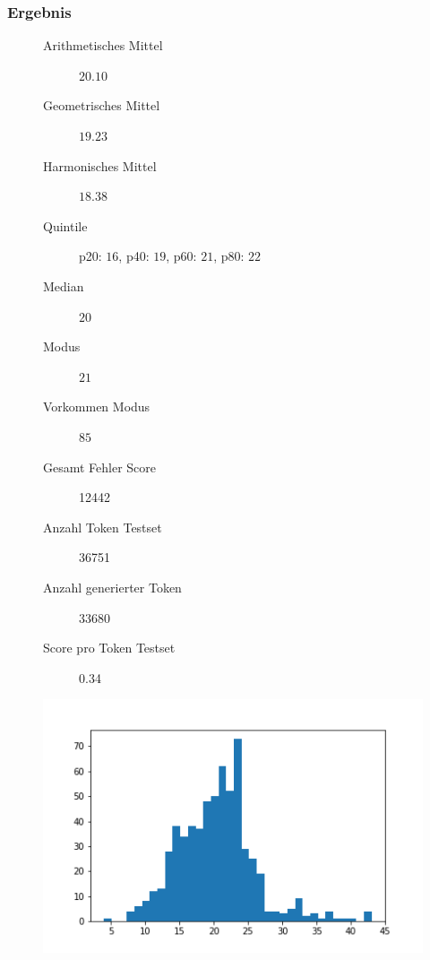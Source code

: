 \documentclass[pdftex,a4paper,halfparskip, article]{scrartcl}
\begin{document}
\subsubsection*{Ergebnis}

\begin{figure}
\centering
\begin{minipage}{.5\textwidth}
  \centering
  \begin{description}
	\item[Arithmetisches Mittel] $20.10$	
	\item[Geometrisches Mittel] $19.23$
	\item[Harmonisches Mittel] $18.38$
	\item[Quintile] p20: $16$, p40: $19$, p60: $21$, p80: $22$
	\item[Median] $20$
	\item[Modus] $21$
	\item[Vorkommen Modus] $85$
	\item[Gesamt Fehler Score] 12442
	\item[Anzahl Token Testset] 36751 
	\item[Anzahl generierter Token] 33680
	\item[Score pro Token Testset]  0.34
\end{description}
  \label{fig:lage_bin19_x}
\end{minipage}%
\begin{minipage}{.5\textwidth}
  \centering
  \includegraphics[width=1\linewidth]{predictions_bin19_x_histogramm}
  \label{fig:hist_bin19_x}
\end{minipage}
\end{figure}
\end{document}
